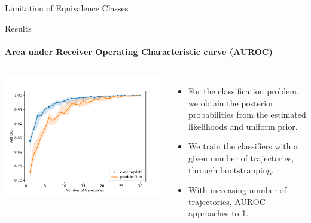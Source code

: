 \documentclass[
english,%
aspectratio=169,%
color={accentcolor=3b},
logo=true,%
colorframetitle=false,%
]{tudabeamer}
\begin{document}
\begin{frame}{Limitation of Equivalence Classes}
\end{frame}


\begin{frame}{Results}
\framesubtitle{Area under Receiver Operating Characteristic curve (AUROC)}
\begin{columns}[onlytextwidth,c]
\centering
\includegraphics[width=\linewidth]{figures/AUROC_perc_0}
\begin{itemize}
	\item For the classification problem, we obtain the posterior probabilities from the estimated likelihoods and uniform prior.
	\item We train the classifiers with a given number of trajectories, through bootstrapping.
	\item With increasing number of trajectories, AUROC approaches to 1.
	
\end{itemize}
\end{columns}
\end{frame}
\end{document}
